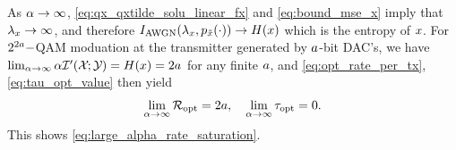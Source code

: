 \documentclass[12pt, draftclsnofoot,journal,onecolumn]{IEEEtran}
\begin{document}
As $\alpha\to\infty$, \eqref{eq:qx_qxtilde_solu_linear_fx} and \eqref{eq:bound_mse_x} imply that $\lambda_x\to\infty$, and therefore $I_{\rm AWGN}(\lambda_x,p_{\tilde{x}}(\cdot))\to H(x)$ which is the entropy of $x$.
For $2^{2a}-$QAM moduation at the transmitter generated by $a$-bit DAC's, we have $\lim_{\alpha\to\infty}\alpha\mathcal{I}{'}({\mathcal{X}}_{};{\mathcal{Y}}_{})=H(x)=2a$
for any finite $a$, and \eqref{eq:opt_rate_per_tx}, \eqref{eq:tau_opt_value} then yield %
\begin{align}
    \lim_{\alpha\to\infty}\mathcal{R}_{\rm opt}=2a,\quad \lim_{\alpha\to\infty}\tau_{{\rm opt}} = 0.
    \label{eq:large_alpha_rate_limit_temp}
\end{align}
This shows \eqref{eq:large_alpha_rate_saturation}.
\end{document}
